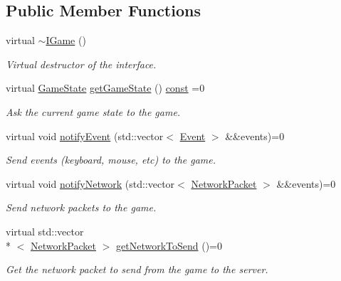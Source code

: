 \subsection*{Public Member Functions}
\begin{DoxyCompactItemize}
\item 
virtual \hyperlink{classarcade_1_1_i_game_a89114f708822e3d0db5b58901c1e2354}{$\sim$\-I\-Game} ()
\begin{DoxyCompactList}\small\item\em Virtual destructor of the interface. \end{DoxyCompactList}\item 
virtual \hyperlink{namespacearcade_a6adca89ee2f539b03980c7e59b044ed7}{Game\-State} \hyperlink{classarcade_1_1_i_game_a75083f0465c0ccbdbbb38c689b4a694c}{get\-Game\-State} () \hyperlink{term__entry_8h_a57bd63ce7f9a353488880e3de6692d5a}{const} =0
\begin{DoxyCompactList}\small\item\em Ask the current game state to the game. \end{DoxyCompactList}\item 
virtual void \hyperlink{classarcade_1_1_i_game_a37d164b4052fa3c28256fb0bf0002876}{notify\-Event} (std\-::vector$<$ \hyperlink{structarcade_1_1_event}{Event} $>$ \&\&events)=0
\begin{DoxyCompactList}\small\item\em Send events (keyboard, mouse, etc) to the game. \end{DoxyCompactList}\item 
virtual void \hyperlink{classarcade_1_1_i_game_aaf375290947abf3db32d966facbfacf3}{notify\-Network} (std\-::vector$<$ \hyperlink{structarcade_1_1_network_packet}{Network\-Packet} $>$ \&\&events)=0
\begin{DoxyCompactList}\small\item\em Send network packets to the game. \end{DoxyCompactList}\item 
virtual std\-::vector\\*
$<$ \hyperlink{structarcade_1_1_network_packet}{Network\-Packet} $>$ \hyperlink{classarcade_1_1_i_game_a5aa80dfdb3c1881fbc749e3d53efc6f8}{get\-Network\-To\-Send} ()=0
\begin{DoxyCompactList}\small\item\em Get the network packet to send from the game to the server. \end{DoxyCompactList}\item 

\end{DoxyCompactItemize}

